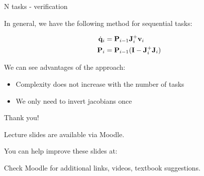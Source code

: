 \documentclass{beamer}
\newcommand{\dq} {\dot{\mathbf{q}}}
\begin{document}
\begin{frame}{N tasks - verification}
	\begin{flushleft}
		
		In general, we have the following method for sequential tasks:
		
		\begin{align}
			\dq_i &= \bo{P}_{i-1} \bo{J}_i^+ \bo{v}_i \\
			\bo{P}_i & =\bo{P}_{i-1} (\bo{I} - \bo{J}_i^+\bo{J}_i)
		\end{align}		
		
		We can see advantages of the approach:
		
		\begin{itemize}
			\item Complexity does not increase with the number of tasks
			
			\item We only need to invert jacobians once
		\end{itemize}
		
	\end{flushleft}
\end{frame}




\begin{frame}{Thank you!}
\centerline{Lecture slides are available via Moodle.}
\bigskip
\centerline{You can help improve these slides at:}
\centerline{\mygit}
\bigskip
\centerline{Check Moodle for additional links, videos, textbook suggestions.}
\bigskip

\centerline{\textcolor{black}{}}

\end{frame}
\end{document}
